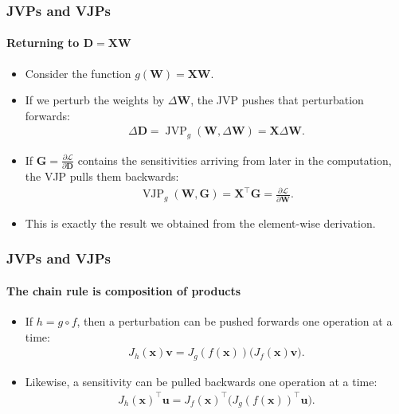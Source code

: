 \documentclass[]{article}
\begin{document}
\begin{frame}
\frametitle{JVPs and VJPs}
\framesubtitle{Returning to $\bm D=\bm X\bm W$}
\begin{itemize}
	\item<+-> Consider the function $g(\bm W)=\bm X\bm W$.
	\item<+-> If we perturb the weights by $\Delta\bm W$, the JVP pushes that perturbation forwards:
	\begin{align*}
		\Delta\bm D=\operatorname{JVP}_g(\bm W,\Delta\bm W)=\bm X\Delta\bm W.
	\end{align*}
	\item<+-> If $\bm G=\frac{\partial\mathcal{L}}{\partial\bm D}$ contains the sensitivities arriving from later in the computation, the VJP pulls them backwards:
	\begin{align*}
		\operatorname{VJP}_g(\bm W,\bm G)=\bm X^\top\bm G
		=\frac{\partial\mathcal{L}}{\partial\bm W}.
	\end{align*}
	\item<+-> This is exactly the result we obtained from the element-wise derivation.
\end{itemize}
\end{frame}

\begin{frame}
\frametitle{JVPs and VJPs}
\framesubtitle{The chain rule is composition of products}
\begin{itemize}
	\item<+-> If $h=g\circ f$, then a perturbation can be pushed forwards one operation at a time:
	\begin{align*}
		J_h(\bm x)\bm v
		=J_g(f(\bm x))\bigl(J_f(\bm x)\bm v\bigr).
	\end{align*}
	\item<+-> Likewise, a sensitivity can be pulled backwards one operation at a time:
	\begin{align*}
		J_h(\bm x)^\top\bm u
		=J_f(\bm x)^\top\bigl(J_g(f(\bm x))^\top\bm u\bigr).
	\end{align*}
\end{itemize}
\end{frame}
\end{document}
